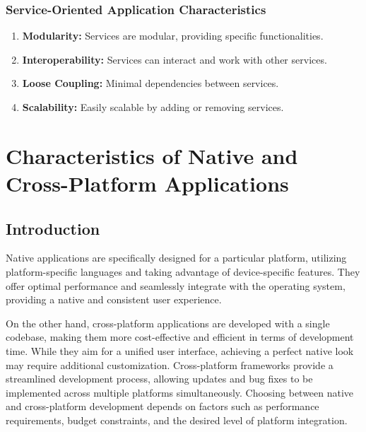 \documentclass[12pt, a4paper, twoside]{article}
\begin{document}
\subsubsection{Service-Oriented Application Characteristics}
\label{subsubsec:soa-characteristics}

\begin{enumerate}
  \item \textbf{Modularity:} Services are modular, providing specific functionalities.
  
  \item \textbf{Interoperability:} Services can interact and work with other services.
  
  \item \textbf{Loose Coupling:} Minimal dependencies between services.
  
  \item \textbf{Scalability:} Easily scalable by adding or removing services.
\end{enumerate}

\newpage

\section{Characteristics of Native and Cross-Platform Applications}
\label{sec:native-cross-platform-characteristics}

\subsection{Introduction}
\label{subsec:native-cross-platform-intro}

Native applications are specifically designed for a particular platform, utilizing platform-specific languages and taking advantage of device-specific features. They offer optimal performance and seamlessly integrate with the operating system, providing a native and consistent user experience. \vspace{1em}

On the other hand, cross-platform applications are developed with a single codebase, making them more cost-effective and efficient in terms of development time. While they aim for a unified user interface, achieving a perfect native look may require additional customization. Cross-platform frameworks provide a streamlined development process, allowing updates and bug fixes to be implemented across multiple platforms simultaneously. Choosing between native and cross-platform development depends on factors such as performance requirements, budget constraints, and the desired level of platform integration.
\end{document}
